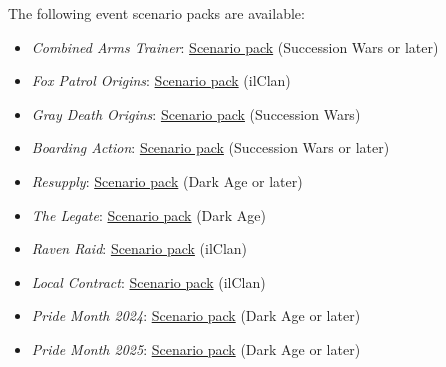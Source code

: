 The following event scenario packs are available:

\begin{itemize}

\item \emph{Combined Arms Trainer}: \href{https://raw.githubusercontent.com/Eudicods/outworlds-wastes/rules-pdf/combined-arms-trainer.pdf}{Scenario pack} (Succession Wars or later)

\item \emph{Fox Patrol Origins}: \href{https://raw.githubusercontent.com/Eudicods/outworlds-wastes/rules-pdf/fox-patrol-origins.pdf}{Scenario pack} (ilClan)

\item \emph{Gray Death Origins}: \href{https://raw.githubusercontent.com/Eudicods/outworlds-wastes/rules-pdf/gray-death-origins.pdf}{Scenario pack} (Succession Wars)

\item \emph{Boarding Action}: \href{https://raw.githubusercontent.com/Eudicods/outworlds-wastes/rules-pdf/boarding-action.pdf}{Scenario pack} (Succession Wars or later)

\item \emph{Resupply}: \href{https://raw.githubusercontent.com/Eudicods/outworlds-wastes/rules-pdf/resupply.pdf}{Scenario pack} (Dark Age or later)

\item \emph{The Legate}: \href{https://raw.githubusercontent.com/Eudicods/outworlds-wastes/rules-pdf/the-legate.pdf}{Scenario pack} (Dark Age)

\item \emph{Raven Raid}: \href{https://raw.githubusercontent.com/Eudicods/outworlds-wastes/rules-pdf/raven-raid.pdf}{Scenario pack} (ilClan)

\item \emph{Local Contract}: \href{https://raw.githubusercontent.com/Eudicods/outworlds-wastes/rules-pdf/local-contract.pdf}{Scenario pack} (ilClan)

\item \emph{Pride Month 2024}: \href{https://raw.githubusercontent.com/Eudicods/outworlds-wastes/rules-pdf/pride-2024.pdf}{Scenario pack} (Dark Age or later)

\item \emph{Pride Month 2025}: \href{https://raw.githubusercontent.com/Eudicods/outworlds-wastes/rules-pdf/pride-2025.pdf}{Scenario pack} (Dark Age or later)

\end{itemize}
